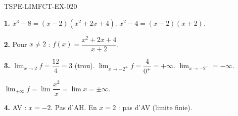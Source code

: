 \begin{corrige}{TSPE-LIMFCT-EX-020}

\textbf{1.} $x^3-8 = (x-2)(x^2+2x+4)$. $x^2-4 = (x-2)(x+2)$.

\textbf{2.} Pour $x
\neq 2$ : $f(x) = \dfrac{x^2+2x+4}{x+2}$.

\textbf{3.} $\lim_{x \to 2} f = \dfrac{12}{4} = \boxed{3}$ (trou). $\lim_{x \to -2^+} f = \dfrac{4}{0^+} = \boxed{+\infty}$. $\lim_{x \to -2^-} = \boxed{-\infty}$.

$\lim_{\pm\infty} f = \lim \dfrac{x^2}{x} = \lim x = \boxed{\pm\infty}$.

\textbf{4.} AV : $x = -2$. Pas d'AH. En $x = 2$ : pas d'AV (limite finie).

\end{corrige}
